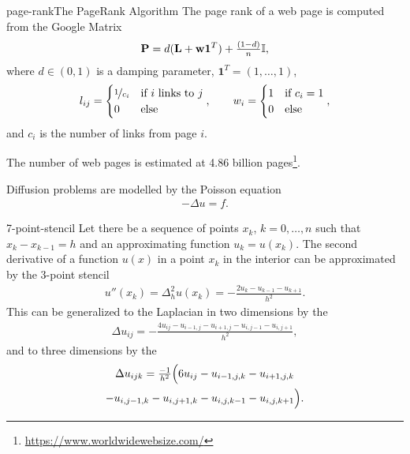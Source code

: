 \begin{Example*}{page-rank}{The PageRank Algorithm}
  The page rank of a web page is computed from the Google Matrix
  \begin{gather}
    \mathbf P = d (\mathbf L+\mathbf w \mathbf 1^T) + \tfrac{(1-d)}{n} \mathbb I,
  \end{gather}
  where $d \in (0,1)$ is a damping parameter, $\mathbf 1^T = (1,\dots,1)$,
  \begin{gather}
    l_{ij} =
    \begin{cases}
      \nicefrac1{c_i} & \text{if $i$ links to $j$}\\0&\text{else} 
    \end{cases},
    \qquad
    w_i =
    \begin{cases}
      1 &\text{if } c_i=1\\
      0&\text{else}
    \end{cases},
  \end{gather}
  and $c_i$ is the number of links from page $i$.

  The number of web pages is estimated at 4.86 billion pages\footnote{\url{https://www.worldwidewebsize.com/}}.
\end{Example*}

\begin{intro}
  Diffusion problems are modelled by the Poisson equation
  \begin{gather}
    -\Delta u = f.
  \end{gather}
\end{intro}

\begin{Example}{7-point-stencil}
  Let there be a sequence of points $x_k$, $k=0,\dots,n$ such that
  $x_k-x_{k-1} = h$ and an approximating function $u_k = u(x_k)$. The
  second derivative of a function $u(x)$ in a point $x_k$ in the
  interior can be approximated by the 3-point stencil
  \begin{gather}
    u''(x_k) = \Delta_h^2 u(x_k) = - \frac{2 u_k - u_{k-1} - u_{k+1}}{h^2}.
  \end{gather}
  This can be generalized to the Laplacian in two dimensions by the 
  \begin{gather}
    \Delta u_{ij} = -\frac{4 u_{ij}- u_{i-1,j} - u_{i+1,j}- u_{i,j-1} - u_{i,j+1}}{h^2},
  \end{gather}
  and to three dimensions by the 
  \begin{multline}
    \Delta u_{ijk} = \tfrac{-1}{h^2}\Bigl(6 u_{ij}
    - u_{i-1,j,k} - u_{i+1,j,k}
    \\
    - u_{i,j-1,k} - u_{i,j+1,k}
    - u_{i,j,k-1} - u_{i,j,k+1}\Bigr).
  \end{multline}
\end{Example}

